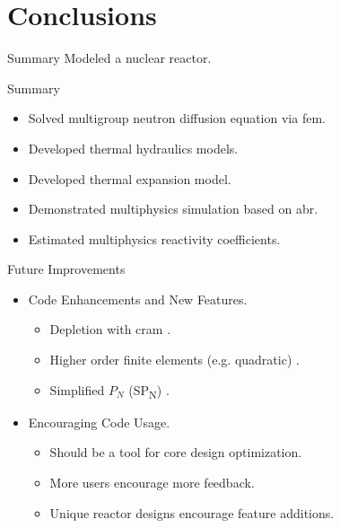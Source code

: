 \section{Conclusions}
\label{sec:conclusions}

\begin{frame}{Summary}
  \pause
  \huge Modeled a nuclear reactor.
\end{frame}

\begin{frame}{Summary}
  \begin{itemize}
    \item Solved multigroup neutron diffusion equation via \gls{fem}.
    \item Developed thermal hydraulics models.
    \item Developed thermal expansion model.
    \item Demonstrated multiphysics simulation based on \gls{abr}.
    \item Estimated multiphysics reactivity coefficients.
  \end{itemize}
\end{frame}

\begin{frame}{Future Improvements}
  \begin{itemize}
    \item Code Enhancements and New Features.
    \begin{itemize}
      \item Depletion with \gls{cram} \cite{cram}.
      \item Higher order finite elements (e.g. quadratic) \cite{Hosseini2013}.
      \item Simplified $P_N$ (SP\textsubscript{N}) \cite{Ryu2013}. %
    \end{itemize}
    \item Encouraging Code Usage.
    \begin{itemize}
      \item Should be a tool for core design optimization.
      \item More users encourage more feedback.
      \item Unique reactor designs encourage feature additions.
    \end{itemize}
  \end{itemize}
\end{frame}
